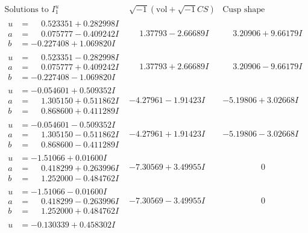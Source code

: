 \documentclass[1p]{elsarticle_modified}
\theoremstyle{definition}
\newcommand{\I}{\sqrt{-1}}
\begin{document}
$$\begin{array}{c|c|c}
\text{Solutions to }I^u_{1}& \I (\text{vol} + \sqrt{-1}CS) & \text{Cusp shape}\\
 \hline 
\begin{aligned}
u &= \phantom{-}0.523351 + 0.282998 I \\
a &= \phantom{-}0.075777 - 0.409242 I \\
b &= -0.227408 + 1.069820 I\end{aligned}
 & \phantom{-}1.37793 - 2.66689 I & \phantom{-}3.20906 + 9.66179 I \\ \hline\begin{aligned}
u &= \phantom{-}0.523351 - 0.282998 I \\
a &= \phantom{-}0.075777 + 0.409242 I \\
b &= -0.227408 - 1.069820 I\end{aligned}
 & \phantom{-}1.37793 + 2.66689 I & \phantom{-}3.20906 - 9.66179 I \\ \hline\begin{aligned}
u &= -0.054601 + 0.509352 I \\
a &= \phantom{-}1.305150 + 0.511862 I \\
b &= \phantom{-}0.868600 + 0.411289 I\end{aligned}
 & -4.27961 - 1.91423 I & -5.19806 + 3.02668 I \\ \hline\begin{aligned}
u &= -0.054601 - 0.509352 I \\
a &= \phantom{-}1.305150 - 0.511862 I \\
b &= \phantom{-}0.868600 - 0.411289 I\end{aligned}
 & -4.27961 + 1.91423 I & -5.19806 - 3.02668 I \\ \hline\begin{aligned}
u &= -1.51066 + 0.01600 I \\
a &= \phantom{-}0.418299 + 0.263996 I \\
b &= \phantom{-}1.252000 - 0.484762 I\end{aligned}
 & -7.30569 + 3.49955 I & \phantom{-0.000000 } 0 \\ \hline\begin{aligned}
u &= -1.51066 - 0.01600 I \\
a &= \phantom{-}0.418299 - 0.263996 I \\
b &= \phantom{-}1.252000 + 0.484762 I\end{aligned}
 & -7.30569 - 3.49955 I & \phantom{-0.000000 } 0 \\ \hline\begin{aligned}
u &= -0.130339 + 0.458302 I \\

\end{aligned}
\end{array}$$
\end{document}
